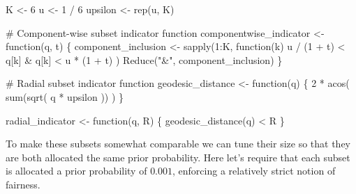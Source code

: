 \documentclass[
  letterpaper,
  DIV=11,
  numbers=noendperiod]{scrartcl}
\newenvironment{Shaded}{\begin{snugshade}}{\end{snugshade}}
\newcommand{\CommentTok}[1]{\textcolor[rgb]{0.37,0.37,0.37}{#1}}
\newcommand{\ControlFlowTok}[1]{\textcolor[rgb]{0.00,0.23,0.31}{#1}}
\newcommand{\DecValTok}[1]{\textcolor[rgb]{0.68,0.00,0.00}{#1}}
\newcommand{\FunctionTok}[1]{\textcolor[rgb]{0.28,0.35,0.67}{#1}}
\newcommand{\NormalTok}[1]{\textcolor[rgb]{0.00,0.23,0.31}{#1}}
\newcommand{\OtherTok}[1]{\textcolor[rgb]{0.00,0.23,0.31}{#1}}
\newcommand{\SpecialCharTok}[1]{\textcolor[rgb]{0.37,0.37,0.37}{#1}}
\newcommand{\StringTok}[1]{\textcolor[rgb]{0.13,0.47,0.30}{#1}}
\begin{document}
\begin{Shaded}
\begin{Highlighting}[]
\NormalTok{K }\OtherTok{\textless{}{-}} \DecValTok{6}
\NormalTok{u }\OtherTok{\textless{}{-}} \DecValTok{1} \SpecialCharTok{/} \DecValTok{6}
\NormalTok{upsilon }\OtherTok{\textless{}{-}} \FunctionTok{rep}\NormalTok{(u, K)}

\CommentTok{\# Component{-}wise subset indicator function}
\NormalTok{componentwise\_indicator }\OtherTok{\textless{}{-}} \ControlFlowTok{function}\NormalTok{(q, t) \{}
\NormalTok{  component\_inclusion }\OtherTok{\textless{}{-}} \FunctionTok{sapply}\NormalTok{(}\DecValTok{1}\SpecialCharTok{:}\NormalTok{K, }\ControlFlowTok{function}\NormalTok{(k) u }\SpecialCharTok{/}\NormalTok{ (}\DecValTok{1} \SpecialCharTok{+}\NormalTok{ t) }\SpecialCharTok{\textless{}}\NormalTok{ q[k] }\SpecialCharTok{\&}
\NormalTok{                                                 q[k] }\SpecialCharTok{\textless{}}\NormalTok{ u }\SpecialCharTok{*}\NormalTok{ (}\DecValTok{1} \SpecialCharTok{+}\NormalTok{ t) )}
  \FunctionTok{Reduce}\NormalTok{(}\StringTok{"\&"}\NormalTok{, component\_inclusion)}
\NormalTok{\}}

\CommentTok{\# Radial subset indicator function}
\NormalTok{geodesic\_distance }\OtherTok{\textless{}{-}} \ControlFlowTok{function}\NormalTok{(q) \{}
  \DecValTok{2} \SpecialCharTok{*} \FunctionTok{acos}\NormalTok{( }\FunctionTok{sum}\NormalTok{(}\FunctionTok{sqrt}\NormalTok{( q }\SpecialCharTok{*}\NormalTok{ upsilon )) )}
\NormalTok{\}}

\NormalTok{radial\_indicator }\OtherTok{\textless{}{-}} \ControlFlowTok{function}\NormalTok{(q, R) \{}
  \FunctionTok{geodesic\_distance}\NormalTok{(q) }\SpecialCharTok{\textless{}}\NormalTok{ R}
\NormalTok{\}}
\end{Highlighting}
\end{Shaded}

To make these subsets somewhat comparable we can tune their size so that
they are both allocated the same prior probability. Here let's require
that each subset is allocated a prior probability of \(0.001\),
enforcing a relatively strict notion of fairness.
\end{document}
